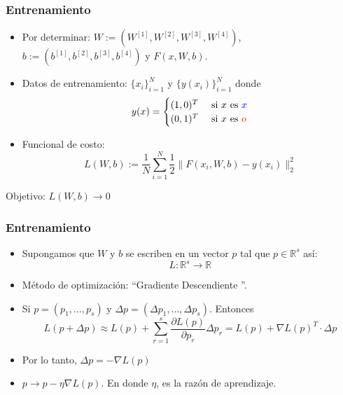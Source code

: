 \documentclass[aspectratio=1610]{beamer}
\begin{document}
\begin{frame}
  \frametitle{Entrenamiento}
  \begin{itemize}
  \item  Por determinar:  $W := (W^{[1]},W^{[2]},W^{[3]},W^{[4]})$, $b:=(b^{[1]},b^{[2]},b^{[3]},b^{[4]})$ y $F(x,W,b)$.
  \item Datos de entrenamiento: $\{x_i\}_{i=1}^N$ y $\{y(x_i)\}_{i=1}^N$ donde
 \begin{displaymath}
      y(x) =
      \begin{cases}
        (1,0)^T & \textnormal{ si } x \textnormal{ es }  \color{blue} x  \\
        (0,1)^T &  \textnormal{ si }  x \textnormal{ es }  \color{red} o
      \end{cases}
    \end{displaymath}
  \item Funcional de costo:
    \begin{displaymath}
      L(W,b):=   \frac{1}{N} \sum_{i=1}^N \frac{1}{2} \|F(x_i,W,b) - y(x_i) \|_2^2
    \end{displaymath}
  \end{itemize}

  Objetivo: $L(W,b)\to 0$
    
  \end{frame}

  \begin{frame}
    \frametitle{Entrenamiento}

    \begin{itemize}
    \item   Supongamos que $W$ y $b$ se escriben en un vector $p$ tal que $p\in \mathbb{R}^s$ as\'i:
      \begin{displaymath}
        L: \mathbb{R}^s\to \mathbb{R}
      \end{displaymath}
    \item Método de optimizaci\'on:  \textquotedblleft Gradiente Descendiente \textquotedblright.
    \item Si $p=(p_1,\ldots,p_s)$ y $\Delta p = (\Delta p_1, \ldots, \Delta p_s)$. Entonces
      \begin{displaymath}
        L(p+\Delta p) \approx L(p) + \sum_{r=1}^{s} \frac{\partial L(p)}{\partial p_r} \Delta p_r = L(p) + \nabla L(p)^T \cdot \Delta p
      \end{displaymath}
    \item Por lo tanto,  $\Delta p = - \nabla L(p)$ \\
    \item $p \to p - \eta \nabla L(p)$. En donde  $\eta$, es la raz\'on de aprendizaje.
   
    \end{itemize}
  \end{frame}
\end{document}
